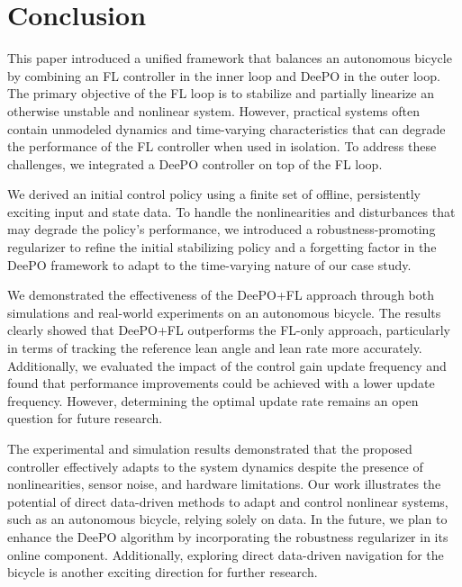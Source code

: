 \section{Conclusion}
\label{sec:5}
This paper introduced a unified framework that balances an autonomous bicycle by combining an FL controller in the inner loop and DeePO in the outer loop. The primary objective of the FL loop is to stabilize and partially linearize an otherwise unstable and nonlinear system. However, practical systems often contain unmodeled dynamics and time-varying characteristics that can degrade the performance of the FL controller when used in isolation. To address these challenges, we integrated a DeePO controller on top of the FL loop.

We derived an initial control policy using a finite set of offline, persistently exciting input and state data. To handle the nonlinearities and disturbances that may degrade the policy's performance, we introduced a robustness-promoting regularizer to refine the initial stabilizing policy and a forgetting factor in the DeePO framework to adapt to the time-varying nature of our case study.

We demonstrated the effectiveness of the DeePO+FL approach through both simulations and real-world experiments on an autonomous bicycle. The results clearly showed that DeePO+FL outperforms the FL-only approach, particularly in terms of tracking the reference lean angle and lean rate more accurately. Additionally, we evaluated the impact of the control gain update frequency and found that performance improvements could be achieved with a lower update frequency. However, determining the optimal update rate remains an open question for future research.

The experimental and simulation results demonstrated that the proposed controller effectively adapts to the system dynamics despite the presence of nonlinearities, sensor noise, and hardware limitations. Our work illustrates the potential of direct data-driven methods to adapt and control nonlinear systems, such as an autonomous bicycle, relying solely on data. In the future, we plan to enhance the DeePO algorithm by incorporating the robustness regularizer in its online component. Additionally, exploring direct data-driven navigation for the bicycle is another exciting direction for further research.
